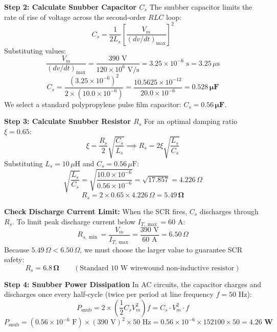 \documentclass[11pt,a4paper]{article}
\begin{document}
\begin{examplebox}
\textbf{Step 2: Calculate Snubber Capacitor $C_s$}
The snubber capacitor limits the rate of rise of voltage across the second-order $RLC$ loop:
\begin{equation}
C_s = \frac{1}{2 L_s} \left[\frac{V_m}{(dv/dt)_{\max}}\right]^2
\end{equation}
Substituting values:
\begin{equation}
\frac{V_m}{(dv/dt)_{\max}} = \frac{390\text{ V}}{120 \times 10^6\text{ V/s}} = 3.25 \times 10^{-6}\text{ s} = 3.25\,\mu\text{s}
\end{equation}
\begin{equation}
C_s = \frac{(3.25 \times 10^{-6})^2}{2 \times (10.0 \times 10^{-6})} = \frac{10.5625 \times 10^{-12}}{20.0 \times 10^{-6}} = \mathbf{0.528\,\mu\text{F}}
\end{equation}
We select a standard polypropylene pulse film capacitor: $C_s = \mathbf{0.56\,\mu\text{F}}$.

\textbf{Step 3: Calculate Snubber Resistor $R_s$}
For an optimal damping ratio $\xi = 0.65$:
\begin{equation}
\xi = \frac{R_s}{2} \sqrt{\frac{C_s}{L_s}} \implies R_s = 2 \xi \sqrt{\frac{L_s}{C_s}}
\end{equation}
Substituting $L_s = 10\,\mu\text{H}$ and $C_s = 0.56\,\mu\text{F}$:
\begin{equation}
\sqrt{\frac{L_s}{C_s}} = \sqrt{\frac{10.0 \times 10^{-6}}{0.56 \times 10^{-6}}} = \sqrt{17.857} = 4.226\,\Omega
\end{equation}
\begin{equation}
R_s = 2 \times 0.65 \times 4.226\,\Omega = \mathbf{5.49\,\Omega}
\end{equation}

\textbf{Check Discharge Current Limit:}
When the SCR fires, $C_s$ discharges through $R_s$. To limit peak discharge current below $I_{T,\max} = 60\text{ A}$:
\begin{equation}
R_{s,\min} = \frac{V_m}{I_{T,\max}} = \frac{390\text{ V}}{60\text{ A}} = 6.50\,\Omega
\end{equation}
Because $5.49\,\Omega < 6.50\,\Omega$, we must choose the larger value to guarantee SCR safety:
\begin{equation}
R_s = \mathbf{6.8\,\Omega} \qquad (\text{Standard } 10\text{ W wirewound non-inductive resistor})
\end{equation}

\textbf{Step 4: Snubber Power Dissipation}
In AC circuits, the capacitor charges and discharges once every half-cycle (twice per period at line frequency $f = 50\text{ Hz}$):
\begin{equation}
P_{\text{snub}} = 2 \times \left(\frac{1}{2} C_s V_m^2\right) f = C_s \cdot V_m^2 \cdot f
\end{equation}
\begin{equation}
P_{\text{snub}} = (0.56 \times 10^{-6}\text{ F}) \times (390\text{ V})^2 \times 50\text{ Hz} = 0.56 \times 10^{-6} \times 152100 \times 50 = \mathbf{4.26\text{ W}}
\end{equation}
\end{examplebox}
\end{document}

